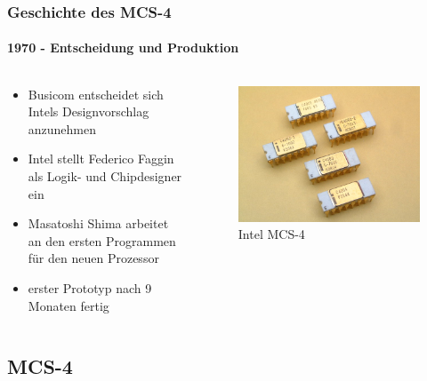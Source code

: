 \begin{frame}
	\frametitle{Geschichte des MCS-4}
	\framesubtitle{1970 - Entscheidung und Produktion}
	\begin{columns}
		\begin{column}{.5\textwidth}	
				\begin{itemize}
					\item Busicom entscheidet sich Intels Designvorschlag anzunehmen
					\item Intel stellt Federico Faggin als Logik- und Chipdesigner ein
					\item Masatoshi Shima arbeitet an den ersten Programmen für den neuen Prozessor
					\item erster Prototyp nach 9 Monaten fertig
				\end{itemize}
		\end{column}
		\begin{column}{.5\textwidth}
			\begin{figure}[ht]
				\includegraphics[width=1\linewidth]{images/intel_chips.jpg}
				\caption{Intel MCS-4}
			\end{figure}
		\end{column}
	\end{columns}
\end{frame}

\subsection{MCS-4}

